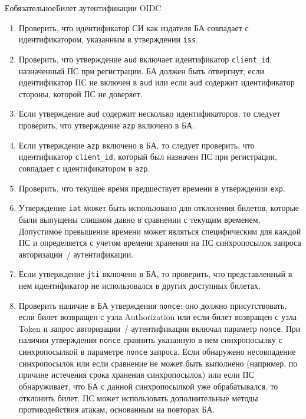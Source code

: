 \begin{appendix}{Е}{обязательное}{Билет аутентификации OIDC}
\begin{enumerate}
\item  
Проверить, что идентификатор СИ как издателя БА совпадает с идентификатором, 
указанным в утверждении \lstinline{iss}.

\item 
Проверить, что утверждение \lstinline{aud} включает идентификатор 
\lstinline{client_id}, назначенный ПС при регистрации.
%
БА должен быть отвергнут, если идентификатор ПС не включен в \lstinline{aud}
или если \lstinline{aud} содержит идентификатор стороны, которой ПС не 
доверяет. 

\item 
Если утверждение \lstinline{aud} содержит несколько идентификаторов, 
то следует проверить, что утверждение \lstinline{azp} включено в БА. 

\item  
Если утверждение \lstinline{azp} включено в БА, то следует проверить, 
что идентификатор \lstinline{client_id}, который был назначен ПС при 
регистрации, совпадает с идентификатором в \lstinline{azp}.

\item 
Проверить, что текущее время предшествует времени в утверждении 
\lstinline{exp}. 

\item 
Утверждение \lstinline{iat} может быть использовано для отклонения
билетов, которые были выпущены слишком давно в сравнении с текущим временем.
Допустимое превышение времени может являться специфическим 
для каждой ПС и определяется с учетом времени хранения на ПС синхропосылок 
запроса авторизации~/ аутентификации.

\item
Если утверждение \lstinline{jti} включено в БА, то проверить, что 
представленный в нем идентификатор не использовался в других доступных
билетах.

\item 
Проверить наличие в БА утверждения \lstinline{nonce}: оно должно 
присутствовать, если билет возвращен с узла Authorization или если билет 
возвращен с узла Token и запрос авторизации~/ аутентификации включал параметр 
\lstinline{nonce}.
%
При наличии утверждения \lstinline{nonce} сравнить указанную в нем 
синхропосылку с синхропосылкой в параметре \lstinline{nonce} запроса.
%
Если обнаружено несовпадение синхропосылок или если сравнение не может быть 
выполнено (например, по причине истечения срока хранения синхропосылок) или если
ПС обнаруживает, что БА с данной синхропосылкой уже обрабатывался, 
то отклонить билет.
%
ПС может использовать дополнительные методы противодействия атакам, основанным 
на повторах БА. 


\end{enumerate}
\end{appendix}

